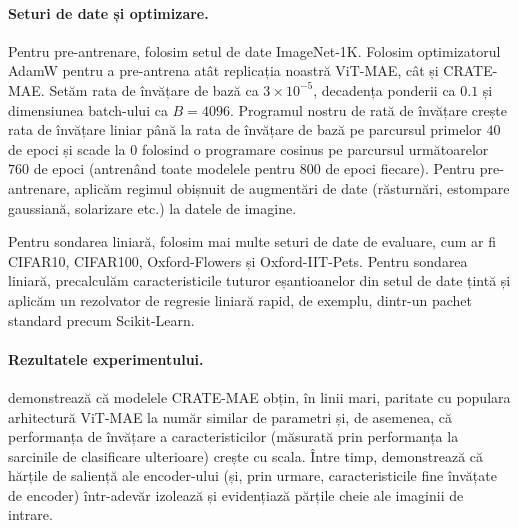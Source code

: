 \documentclass[../../book-main_ro.tex]{subfiles}
\begin{document}
\paragraph{Seturi de date și optimizare.} Pentru pre-antrenare, folosim setul de date ImageNet-1K. Folosim optimizatorul AdamW pentru a pre-antrena atât replicația noastră ViT-MAE, cât și CRATE-MAE. Setăm rata de învățare de bază ca \(3 \times 10^{-5}\), decadența ponderii ca \(0.1\) și dimensiunea batch-ului ca \(B = 4096\). Programul nostru de rată de învățare crește rata de învățare liniar până la rata de învățare de bază pe parcursul primelor \(40\) de epoci și scade la \(0\) folosind o programare cosinus pe parcursul următoarelor \(760\) de epoci (antrenând toate modelele pentru \(800\) de epoci fiecare). Pentru pre-antrenare, aplicăm regimul obișnuit de augmentări de date (răsturnări, estompare gaussiană, solarizare etc.) la datele de imagine.

Pentru sondarea liniară, folosim mai multe seturi de date de evaluare, cum ar fi CIFAR10, CIFAR100, Oxford-Flowers și Oxford-IIT-Pets. Pentru sondarea liniară, precalculăm caracteristicile tuturor eșantioanelor din setul de date țintă și aplicăm un rezolvator de regresie liniară rapid, de exemplu, dintr-un pachet standard precum Scikit-Learn.

\paragraph{Rezultatele experimentului.}  demonstrează că modelele CRATE-MAE obțin, în linii mari, paritate cu populara arhitectură ViT-MAE la număr similar de parametri și, de asemenea, că performanța de învățare a caracteristicilor (măsurată prin performanța la sarcinile de clasificare ulterioare) crește cu scala. Între timp,  demonstrează că hărțile de saliență ale encoder-ului (și, prin urmare, caracteristicile fine învățate de encoder) într-adevăr izolează și evidențiază părțile cheie ale imaginii de intrare.
\end{document}
